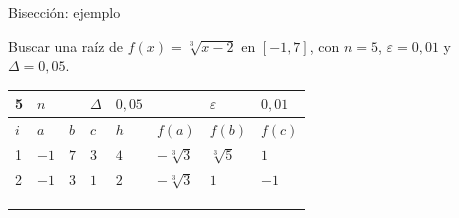 \documentclass[original_version/main.tex]{subfiles}
\begin{document}
\begin{frame}[t]{Bisección: ejemplo}
\begin{minipage}[t][13mm][t]{\textwidth}\small Buscar una raíz de $f(x)=\sqrt[3]{x-2}$ en $[-1,7]$, con $n=5$, $\varepsilon=0{,}01$ y $\Delta=0{,}05$.\end{minipage}\par{\scriptsize\setlength{\tabcolsep}{2pt}\renewcommand{\arraystretch}{1}\begin{center}\begin{tabular}{|C{.04\textwidth}|C{.112\textwidth}|C{.112\textwidth}|C{.112\textwidth}|C{.112\textwidth}|C{.112\textwidth}|C{.112\textwidth}|C{.112\textwidth}|}
\hline
\rule{0pt}{4.3mm}5 & $n$ &  &  $\Delta$  & $0{,}05$ &  & $\varepsilon$ & $0{,}01$\\\hline
\rule{0pt}{4.3mm}$i$ & $a$ & $b$ & $c$ & $h$ & $f(a)$ & $f(b)$ & $f(c)$\\\hline
\rule{0pt}{4.3mm}1 & $-1$ & $7$ & $3$ & $4$ & $-\sqrt[3]3$ & $\sqrt[3]5$ & $1$\\\hline
\rule{0pt}{4.3mm}2 & $-1$ & $3$ & $1$ & $2$ & $-\sqrt[3]3$ & $1$ & $-1$\\\hline
\rule{0pt}{4.3mm} &  &  &  &  &  &  & \\\hline
\rule{0pt}{4.3mm} &  &  &  &  &  &  & \\\hline
\rule{0pt}{4.3mm} &  &  &  &  &  &  & \\\hline
\end{tabular}\end{center}}\begin{minipage}[t][10mm][t]{\textwidth}\footnotesize \end{minipage}
\end{frame}
\end{document}
